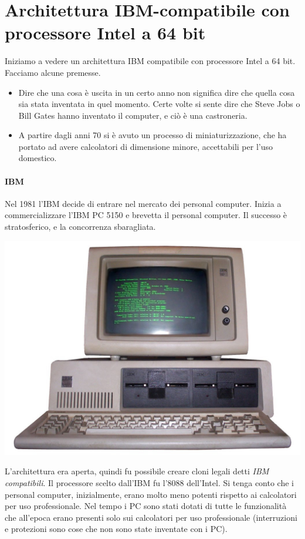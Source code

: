 \documentclass[11pt]{report}
\theoremstyle{definition}
\begin{document}
\section{Architettura IBM-compatibile con processore Intel a 64 bit}
Iniziamo a vedere un architettura IBM compatibile con processore Intel a 64 bit. Facciamo alcune premesse.
\begin{itemize}
\item Dire che una cosa è uscita in un certo anno non significa dire che quella cosa sia stata inventata in quel momento. Certe volte si sente dire che Steve Jobs o Bill Gates hanno inventato il computer, e ciò è una castroneria.
\item A partire dagli anni 70 si è avuto un processo di miniaturizzazione, che ha portato ad avere calcolatori di dimensione minore, accettabili per l'uso domestico.
\end{itemize}
\paragraph{IBM} Nel 1981 l'IBM decide di entrare nel mercato dei personal computer. Inizia a commercializzare l'IBM PC 5150 e brevetta il personal computer. Il successo è stratosferico, e la concorrenza sbaragliata. 
\begin{center}
\includegraphics[scale=.25]{img/130.PNG}
\end{center}L'architettura era aperta, quindi fu possibile creare cloni legali detti \emph{IBM compatibili}. Il processore scelto dall'IBM fu l'8088 dell'Intel. 
Si tenga conto che i personal computer, inizialmente, erano molto meno potenti rispetto ai calcolatori per uso professionale. Nel tempo i PC sono stati dotati di tutte le funzionalità che all'epoca erano presenti solo sui calcolatori per uso professionale (interruzioni e protezioni sono cose che non sono state inventate con i PC).
\end{document}
